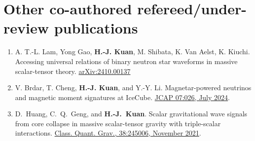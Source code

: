 \documentclass[10pt,floatfix,a4paper]{article}
\begin{document}
\section*{Other co-authored refereed/under-review publications}
\begin{enumerate}
	\item A. T.-L. Lam, Yong Gao, \textbf{H.-J. Kuan}, M. Shibata, K. Van Aelst, K. Kiuchi. Accessing universal relations of binary neutron star waveforms in massive scalar-tensor theory. \href{https://arxiv.org/abs/2410.00137 }{arXiv:2410.00137 }
	\item V. Brdar, T. Cheng, \textbf{H.-J. Kuan}, and Y.-Y. Li. Magnetar-powered neutrinos and magnetic moment signatures at IceCube. \href{https://iopscience.iop.org/article/10.1088/1475-7516/2024/07/026}{JCAP 07:026, July 2024}. 
	\item D.~Huang, C.~Q.~Geng, and \textbf{H.-J.~Kuan}. Scalar gravitational wave signals from core collapse in massive scalar-tensor gravity with triple-scalar interactions. \href{https://doi.org/10.1088/1361-6382/ac35ab}{Class. Quant. Grav., 38:245006, November 2021}.
\end{enumerate}
\end{document}

